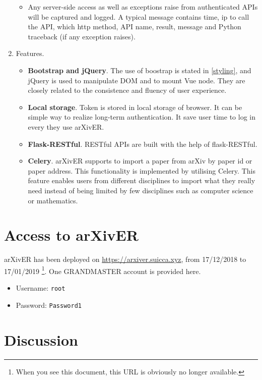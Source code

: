 \documentclass[letterpaper,12pt]{article}
\begin{document}
\begin{enumerate}[label=\alph*)]
\begin{itemize}
                \item Any server-side access as well as exceptions raise from authenticated APIs will be captured and logged. A typical message contains time, ip to call the API, which http method, API name, result, message and Python traceback (if any exception raises).
            \end{itemize}
        \item Features.
            \begin{itemize}
                \item \textbf{Bootstrap and jQuery}. The use of boostrap is stated in \ref{styling}, and jQuery is used to manipulate DOM and to mount Vue node. They are closely related to the consistence and fluency of user experience.
                \item \textbf{Local storage}. Token is stored in local storage of browser. It can be simple way to realize long-term authentication. It save user time to log in every they use arXivER.
                \item \textbf{Flask-RESTful}. RESTful APIs are built with the help of flask-RESTful. 
                \item \textbf{Celery}. arXivER supports to import a paper from arXiv by paper id or paper address. This functionality is implemented by utilising Celery. This feature enables users from different disciplines to import what they really need instead of being limited by few disciplines such as computer science or mathematics.
            \end{itemize}
    \end{enumerate}
    
    
	
    \section{Access to arXivER}
    
    
    arXivER has been deployed on \url{https://arxiver.suicca.xyz}, from 17/12/2018 to 17/01/2019 \footnote{When you see this document, this URL is obviously no longer available.}.
    One GRANDMASTER account is provided here.
    \begin{itemize}
        \item Username: \texttt{root}
        \item Password: \texttt{Password1}
    \end{itemize}
    
    \section{Discussion}
    
\end{document}
